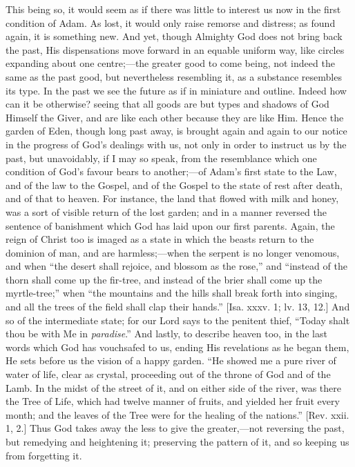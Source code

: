 This being so, it would seem as if there was little to interest us
now in the first condition of Adam. As lost, it would only raise
remorse and distress; as found again, it is something new. And yet,
though Almighty God does not bring back the past, His dispensations
move forward in an equable uniform way, like circles expanding about
one centre;—the greater good to come being, not indeed the same as
the past good, but nevertheless resembling it, as a substance
resembles its type. In the past we see the future as if in miniature
and outline. Indeed how can it be otherwise? seeing that all goods are
but types and shadows of God Himself the Giver, and are like each
other because they are like Him. Hence the garden of Eden, though long
past away, is brought again and again to our notice in the progress of
God's dealings with us, not only in order to instruct us by the past,
but unavoidably, if I may so speak, from the resemblance which one
condition of God's favour bears to another;—of Adam's first state to
the Law, and of the law to the Gospel, and of the Gospel to the state
of rest after death, and of that to heaven. For instance, the land
that flowed with milk and honey, was a sort of visible return of the
lost garden; and in a manner reversed the sentence of banishment which
God has laid upon our first parents. Again, the reign of Christ too is
imaged as a state in which the beasts return to the dominion of man,
and are harmless;—when the serpent is no longer venomous, and when
``the desert shall rejoice, and blossom as the rose,'' and
``instead of the thorn shall come up the fir-tree, and instead of
the brier shall come up the myrtle-tree;'' when ``the
mountains and the hills shall break forth into singing, and all the
trees of the field shall clap their hands.'' [Isa. xxxv. 1; lv.
13, 12.] And so of the intermediate state; for our Lord says to the
penitent thief, ``Today shalt thou be with Me in \emph{paradise}.''
And lastly, to describe heaven too, in the last words which God has
vouchsafed to us, ending His revelations as he began them, He sets
before us the vision of a happy garden. ``He showed me a pure
river of water of life, clear as crystal, proceeding out of the throne
of God and of the Lamb. In the midst of the street of it, and on
either side of the river, was there the Tree of Life, which had twelve
manner of fruits, and yielded her fruit every month; and the leaves of
the Tree were for the healing of the nations.'' [Rev. xxii. 1, 2.]
Thus God takes away the less to give the greater,—not reversing the
past, but remedying and heightening it; preserving the pattern of it,
and so keeping us from forgetting it.

